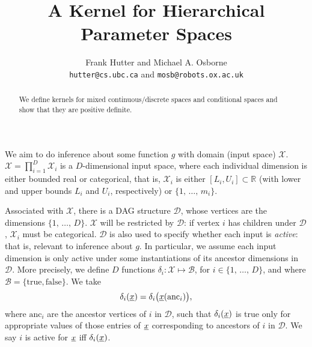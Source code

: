 \documentclass[letterpaper]{article}
\newcommand{\vect}[1]{\underline{\smash{#1}}}
\renewcommand{\v}[1]{\vect{#1}}
\newcommand{\reals}{\mathds{R}}
\newcommand{\sX}{\mathcal{X}}
\newcommand{\sD}{\mathcal{D}}
\begin{document}
\title{A Kernel for Hierarchical Parameter Spaces}

\author{Frank Hutter and Michael A. Osborne\\
{\tt hutter@cs.ubc.ca} and {\tt mosb@robots.ox.ac.uk}
}

\maketitle
\begin{abstract}
\noindent{}We define kernels for mixed continuous/discrete spaces and conditional spaces and show that they are positive definite.
\end{abstract}

We aim to do inference about some function $g$ with domain (input space) $\sX$. $\sX = \prod_{i=1}^D \sX_i$ is a $D$-dimensional input space, where each individual dimension is either bounded real or categorical, that is, $\sX_i$ is either $[L_i, U_i] \subset \reals$ (with lower and upper bounds $L_i$ and $U_i$, respectively) or $\{1,\,\ldots,\,m_i\}$. 

Associated with $\sX$, there is a DAG structure $\sD$, whose vertices are the dimensions $\{1,\,\ldots,\,D\}$. $\sX$ will be restricted by $\sD$: if vertex $i$ has children under $\sD$, $\sX_i$ must be categorical. $\sD$ is also used to specify whether each input is \emph{active}: that is, relevant to inference about $g$. In particular, we assume each input dimension is only active under some instantiations of its ancestor dimensions in $\sD$. More precisely, we define $D$ functions $\delta_i\colon \sX\mapsto \mathcal{B}$, for $i \in \{1,\,\ldots,\,D\}$, and where $\mathcal{B} = \{\text{true}, \text{false}\}$. We take 
\begin{equation}
 \delta_i(\v{x}) = \delta_i\bigl(\v{x}(\text{anc}_i)\bigr),
\end{equation}
where $\text{anc}_i$ are the ancestor vertices of $i$ in $\sD$, such that $\delta_i(\v{x})$ is true only for appropriate values of those entries of $\v{x}$ corresponding to ancestors of $i$ in $\sD$. We say $i$ is active for $\v{x}$ iff $\delta_i(\v{x})$.
\end{document}
